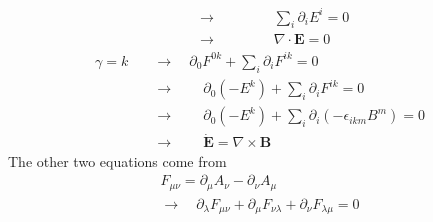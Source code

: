 \documentclass[../main.tex]{subfiles}
\begin{document}
\begin{enumerate}[(a)]
\begin{align}
&\quad\rightarrow\qquad\qquad\sum_i\partial_iE^i=0\\
&\quad\rightarrow\qquad\qquad\nabla\cdot\mathbf{E}=0
\end{align}
\begin{align}
\gamma=k
&\quad\rightarrow\quad\partial_0F^{0k}+\sum_i\partial_iF^{ik}=0\\
&\quad\rightarrow\qquad\partial_0(-E^k)+\sum_i\partial_iF^{ik}=0\\
&\quad\rightarrow\qquad\partial_0(-E^k)+\sum_i\partial_i(-\epsilon_{ikm}B^m)=0\\
&\quad\rightarrow\qquad\dot{\mathbf{E}}=\nabla\times\mathbf{B}
\end{align}
The other two equations come from
\begin{align}
F_{\mu\nu}=\partial_\mu A_\nu-\partial_\nu A_\mu\\
\rightarrow\quad \partial_\lambda F_{\mu\nu}+\partial_\mu F_{\nu\lambda}+\partial_\nu F_{\lambda\mu}=0
\end{align}


\end{enumerate}
\end{document}
